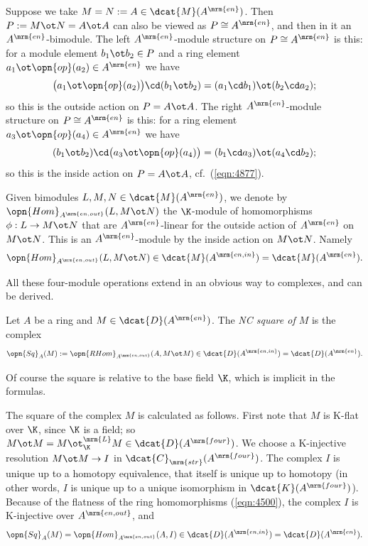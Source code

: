 \begin{exa} \label{exa:5125}
Suppose we take $M = N := A \in \dcat{M}(A^{\mrm{en}})$.
Then $P := M \ot N = A \ot A$ can also be viewed as 
$P \cong A^{\mrm{en}}$, and then in it an 
$A^{\mrm{en}}$-bimodule. The left $A^{\mrm{en}}$-module structure on 
$P \cong A^{\mrm{en}}$ is this: for a module element $b_1 \ot b_2 \in P$ and a 
ring element $a_1 \ot \opn{op}(a_2) \in A^{\mrm{en}}$ we have 
\[ \bigl( a_1 \ot \opn{op}(a_2) \bigr) \cd (b_1 \ot b_2) = 
(a_1 \cd b_1) \ot (b_2 \cd a_2) ; \]
so this is the outside action on $P = A \ot A$. The right $A^{\mrm{en}}$-module 
structure on $P \cong A^{\mrm{en}}$ is this: for a ring element 
$a_3 \ot \opn{op}(a_4) \in A^{\mrm{en}}$ we have 
\[ (b_1 \ot b_2) \cd \bigl( a_3 \ot \opn{op}(a_4) \bigr) = 
(b_1 \cd a_3) \ot (a_4 \cd b_2) ; \]
so this is the inside action on $P = A \ot A$, cf.\ (\ref{eqn:4877}). 
\end{exa}

Given bimodules $L, M, N \in \dcat{M}(A^{\mrm{en}})$,
we denote by
$\opn{Hom}_{A^{\mrm{en, out}}}(L, M \ot N)$
the $\K$-module of homomorphisms $\phi : L \to M \ot N$ 
that are $A^{\mrm{en}}$-linear for the outside action of $A^{\mrm{en}}$ on 
$M \ot N$. This is an 
$A^{\mrm{en}}$-module by the inside action on $M \ot N$. 
Namely 
\[ \opn{Hom}_{A^{\mrm{en, out}}}(L, M \ot N)
\in \dcat{M}(A^{\mrm{en, in}}) = \dcat{M}(A^{\mrm{en}}) . \]

All these four-module operations extend in an obvious way to complexes, and 
can be derived. 

\begin{dfn} \label{dfn:4215}
Let $A$ be a ring and $M \in \dcat{D}(A^{\mrm{en}})$. 
The {\em NC square of $M$} 
is the complex
\[ \opn{Sq}_{A}(M) := 
\opn{RHom}_{A^{\mrm{en, out}}}(A, M \ot M) \in 
\dcat{D}(A^{\mrm{en, in}}) = \dcat{D}(A^{\mrm{en}}) . \]
\end{dfn}

Of course the square is relative to the base field $\K$, which is implicit in 
the formulas. 

The square of the complex $M$ is calculated as follows. First note that $M$ is 
K-flat over $\K$, since $\K$ is a field; so 
$M \ot M = M \ot^{\mrm{L}}_{\K} M \in \dcat{D}(A^{\mrm{four}})$.
We choose a K-injective resolution 
$M \ot M \to I$ in $\dcat{C}_{\mrm{str}}(A^{\mrm{four}})$. 
The complex $I$ is unique up to a homotopy equivalence, that itself is unique 
up to homotopy (in other words, $I$ is unique up to a unique isomorphism in 
$\dcat{K}(A^{\mrm{four}})$). Because of the flatness of the ring homomorphisms 
(\ref{eqn:4500}), the complex 
$I$ is K-injective over $A^{\mrm{en, out}}$, and 
\begin{equation} \label{eqn:4370}
\opn{Sq}_{A}(M) = \opn{Hom}_{A^{\mrm{en, out}}}(A, I) \in 
\dcat{D}(A^{\mrm{en, in}}) = \dcat{D}(A^{\mrm{en}}) .
\end{equation}

